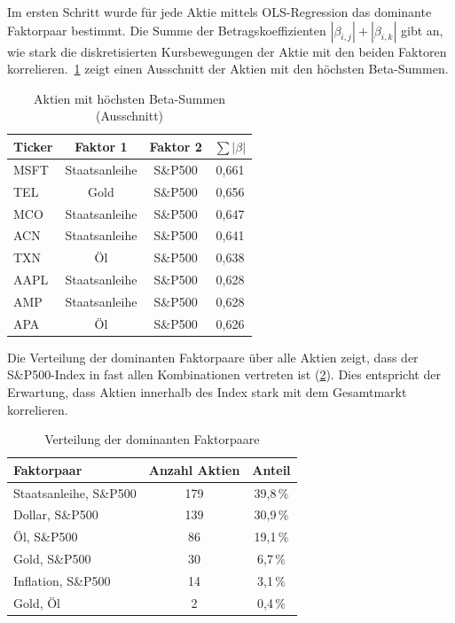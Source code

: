 Im ersten Schritt wurde für jede Aktie mittels \ac{OLS}-Regression das dominante Faktorpaar bestimmt. Die Summe der Betragskoeffizienten $|\beta_{i,j}| + |\beta_{i,k}|$ gibt an, wie stark die diskretisierten Kursbewegungen der Aktie mit den beiden Faktoren korrelieren.~\cref{tab:beta_beispiele} zeigt einen Ausschnitt der Aktien mit den höchsten Beta-Summen.

\begin{table}[htbp]
    \centering
    \begin{tabular}{l c c c}
        Ticker & Faktor 1      & Faktor 2 & $\sum|\beta|$ \\
        \hline
        MSFT   & Staatsanleihe & S\&P500  & 0,661         \\
        TEL    & Gold          & S\&P500  & 0,656         \\
        MCO    & Staatsanleihe & S\&P500  & 0,647         \\
        ACN    & Staatsanleihe & S\&P500  & 0,641         \\
        TXN    & Öl            & S\&P500  & 0,638         \\
        AAPL   & Staatsanleihe & S\&P500  & 0,628         \\
        AMP    & Staatsanleihe & S\&P500  & 0,628         \\
        APA    & Öl            & S\&P500  & 0,626         \\
        \hline
    \end{tabular}
    \caption{Aktien mit höchsten Beta-Summen (Ausschnitt)}\label{tab:beta_beispiele}
\end{table}

Die Verteilung der dominanten Faktorpaare über alle Aktien zeigt, dass der S\&P500-Index in fast allen Kombinationen vertreten ist (\cref{tab:faktorpaar_verteilung}). Dies entspricht der Erwartung, dass Aktien innerhalb des Index stark mit dem Gesamtmarkt korrelieren.

\begin{table}[htbp]
    \centering
    \begin{tabular}{l c c}
        Faktorpaar             & Anzahl Aktien & Anteil   \\
        \hline
        Staatsanleihe, S\&P500 & 179           & 39,8\,\% \\
        Dollar, S\&P500        & 139           & 30,9\,\% \\
        Öl, S\&P500            & 86            & 19,1\,\% \\
        Gold, S\&P500          & 30            & 6,7\,\%  \\
        Inflation, S\&P500     & 14            & 3,1\,\%  \\
        Gold, Öl               & 2             & 0,4\,\%  \\
        \hline
    \end{tabular}
    \caption{Verteilung der dominanten Faktorpaare}\label{tab:faktorpaar_verteilung}
\end{table}

